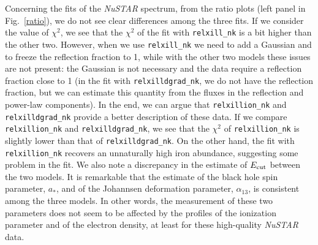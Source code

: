 \documentclass[twocolumn]{emulateapj}
\begin{document}
Concerning the fits of the \textsl{NuSTAR} spectrum, from the ratio plots (left panel in Fig.~\ref{ratio}), we do not see clear differences among the three fits. If we consider the value of $\chi^2$, we see that the $\chi^2$ of the fit with {\tt relxill\_nk} is a bit higher than the other two. However, when we use {\tt relxill\_nk} we need to add a Gaussian and to freeze the reflection fraction to 1, while with the other two models these issues are not present: the Gaussian is not necessary and the data require a reflection fraction close to 1 (in the fit with {\tt relxilldgrad\_nk}, we do not have the reflection fraction, but we can estimate this quantity from the fluxes in the reflection and power-law components). In the end, we can argue that {\tt relxillion\_nk} and {\tt relxilldgrad\_nk} provide a better description of these data. If we compare {\tt relxillion\_nk} and {\tt relxilldgrad\_nk}, we see that the $\chi^2$ of {\tt relxillion\_nk} is slightly lower than that of {\tt relxilldgrad\_nk}. On the other hand, the fit with {\tt relxillion\_nk} recovers an unnaturally high iron abundance, suggesting some problem in the fit. We also note a discrepancy in the estimate of $E_{\rm cut}$ between the two models. It is remarkable that the estimate of the black hole spin parameter, $a_*$, and of the Johannsen deformation parameter, $\alpha_{13}$, is consistent among the three models. In other words, the measurement of these two parameters does not seem to be affected by the profiles of the ionization parameter and of the electron density, at least for these high-quality \textsl{NuSTAR} data. 
\end{document}

